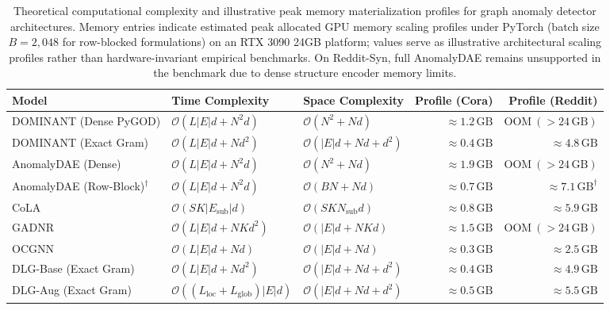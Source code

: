 \documentclass[applsci,article,submit,moreauthors,pdftex]{Definitions/mdpi}
\begin{document}
\begin{table}[htbp]
\centering\footnotesize\setlength{\tabcolsep}{3pt}
\caption{Theoretical computational complexity and illustrative peak memory materialization profiles for graph anomaly detector architectures. Memory entries indicate estimated peak allocated GPU memory scaling profiles under PyTorch (batch size $B=2{,}048$ for row-blocked formulations) on an RTX 3090 24GB platform; values serve as illustrative architectural scaling profiles rather than hardware-invariant empirical benchmarks. On Reddit-Syn, full AnomalyDAE remains unsupported in the benchmark due to dense structure encoder memory limits.}
\label{tab:complexity_comparison}
\begin{tabularx}{\textwidth}{lXXrr}\toprule
\textbf{Model} & \textbf{Time Complexity} & \textbf{Space Complexity} & \textbf{Profile (Cora)} & \textbf{Profile (Reddit)} \\\midrule
DOMINANT (Dense PyGOD) & $\mathcal{O}(L |E| d + N^2 d)$ & $\mathcal{O}(N^2 + N d)$ & $\approx 1.2\,\mathrm{GB}$ & $\mathrm{OOM}\ (>24\,\mathrm{GB})$ \\
DOMINANT (Exact Gram) & $\mathcal{O}(L |E| d + N d^2)$ & $\mathcal{O}(|E| d + N d + d^2)$ & $\approx 0.4\,\mathrm{GB}$ & $\approx 4.8\,\mathrm{GB}$ \\
AnomalyDAE (Dense) & $\mathcal{O}(L |E| d + N^2 d)$ & $\mathcal{O}(N^2 + N d)$ & $\approx 1.9\,\mathrm{GB}$ & $\mathrm{OOM}\ (>24\,\mathrm{GB})$ \\
AnomalyDAE (Row-Block)$^\dagger$ & $\mathcal{O}(L |E| d + N^2 d)$ & $\mathcal{O}(B N + N d)$ & $\approx 0.7\,\mathrm{GB}$ & $\approx 7.1\,\mathrm{GB}^\dagger$ \\
CoLA & $\mathcal{O}(S K |E_{\mathrm{sub}}| d)$ & $\mathcal{O}(S K N_{\mathrm{sub}} d)$ & $\approx 0.8\,\mathrm{GB}$ & $\approx 5.9\,\mathrm{GB}$ \\
GADNR & $\mathcal{O}(L |E| d + N K d^2)$ & $\mathcal{O}(|E| d + N K d)$ & $\approx 1.5\,\mathrm{GB}$ & $\mathrm{OOM}\ (>24\,\mathrm{GB})$ \\
OCGNN & $\mathcal{O}(L |E| d + N d)$ & $\mathcal{O}(|E| d + N d)$ & $\approx 0.3\,\mathrm{GB}$ & $\approx 2.5\,\mathrm{GB}$ \\
DLG-Base (Exact Gram) & $\mathcal{O}(L |E| d + N d^2)$ & $\mathcal{O}(|E| d + N d + d^2)$ & $\approx 0.4\,\mathrm{GB}$ & $\approx 4.9\,\mathrm{GB}$ \\
DLG-Aug (Exact Gram) & $\mathcal{O}((L_{\mathrm{loc}} + L_{\mathrm{glob}}) |E| d)$ & $\mathcal{O}(|E| d + N d + d^2)$ & $\approx 0.5\,\mathrm{GB}$ & $\approx 5.5\,\mathrm{GB}$ \\\bottomrule
\end{tabularx}
\end{table}
\end{document}
